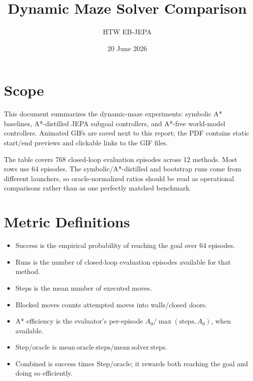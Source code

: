 \documentclass[10pt]{article}
\title{Dynamic Maze Solver Comparison}
\author{HTW EB-JEPA}
\date{20 June 2026}
\begin{document}
\maketitle

\section*{Scope}
This document summarizes the dynamic-maze experiments: symbolic A* baselines,
A*-distilled JEPA subgoal controllers, and A*-free world-model controllers.
Animated GIFs are saved next to this report; the PDF contains static start/end
previews and clickable links to the GIF files.

The table covers 768 closed-loop evaluation episodes across
12 methods. Most rows use 64 episodes. The symbolic/A*-distilled and
bootstrap runs come from different launchers, so oracle-normalized ratios should
be read as operational comparisons rather than as one perfectly matched
benchmark.

\section*{Metric Definitions}
\begin{itemize}
  \item Success is the empirical probability of reaching the goal over 64 episodes.
  \item Runs is the number of closed-loop evaluation episodes available for that method.
  \item Steps is the mean number of executed moves.
  \item Blocked moves counts attempted moves into walls/closed doors.
  \item A* efficiency is the evaluator's per-episode \(A_0/\max(\mathrm{steps}, A_0)\), when available.
  \item Step/oracle is \(\mathrm{mean\ oracle\ steps}/\mathrm{mean\ solver\ steps}\).
  \item Combined is success times Step/oracle; it rewards both reaching the goal and doing so efficiently.
\end{itemize}
\end{document}

